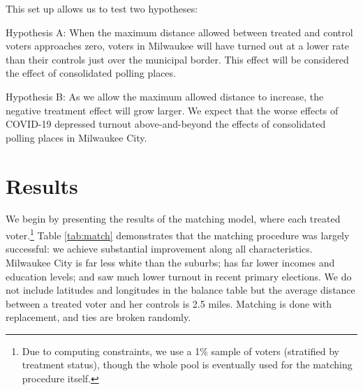 \documentclass[
  12pt,
]{article}
\begin{document}
This set up allows us to test two hypotheses:

Hypothesis A: When the maximum distance allowed between treated and control voters approaches zero, voters in Milwaukee will have turned out at a lower rate than their controls just over the municipal border. This effect will be considered the effect of consolidated polling places.

Hypothesis B: As we allow the maximum allowed distance to increase, the negative treatment effect will grow larger. We expect that the worse effects of COVID-19 depressed turnout above-and-beyond the effects of consolidated polling places in Milwaukee City.

\hypertarget{results}{%
\section*{Results}\label{results}}

We begin by presenting the results of the matching model, where each treated voter.\footnote{Due to computing constraints, we use a 1\% sample of voters (stratified by treatment status), though the whole pool is eventually used for the matching procedure itself.} Table \ref{tab:match} demonstrates that the matching procedure was largely successful: we achieve substantial improvement along all characteristics. Milwaukee City is far less white than the suburbs; has far lower incomes and education levels; and saw much lower turnout in recent primary elections. We do not include latitudes and longitudes in the balance table but the average distance between a treated voter and her controls is 2.5 miles. Matching is done with replacement, and ties are broken randomly.
\end{document}
